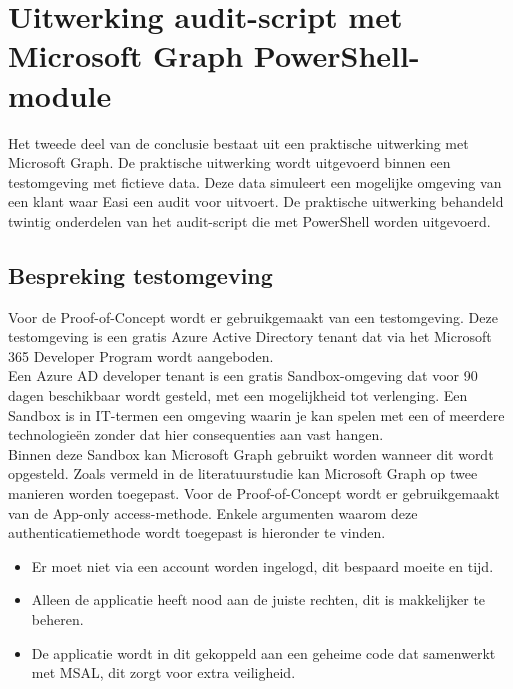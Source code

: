 
\chapter{Uitwerking audit-script met Microsoft Graph PowerShell-module}%
\label{ch:poc}


Het tweede deel van de conclusie bestaat uit een praktische uitwerking met Microsoft Graph. De praktische uitwerking wordt uitgevoerd binnen een testomgeving met fictieve data. Deze data simuleert een mogelijke omgeving van een klant waar Easi een audit voor uitvoert. De praktische uitwerking behandeld twintig onderdelen van het audit-script die met PowerShell worden uitgevoerd. %

\section{Bespreking testomgeving}

Voor de Proof-of-Concept wordt er gebruikgemaakt van een testomgeving. Deze testomgeving is een gratis Azure Active Directory tenant dat via het Microsoft 365 Developer Program wordt aangeboden. \\

Een Azure \ac{AD} developer tenant is een gratis Sandbox-omgeving dat voor 90 dagen beschikbaar wordt gesteld, met een mogelijkheid tot verlenging. Een Sandbox is in \ac{IT}-termen een omgeving waarin je kan spelen met een of meerdere technologieën zonder dat hier consequenties aan vast hangen. \\

Binnen deze Sandbox kan Microsoft Graph gebruikt worden wanneer dit wordt opgesteld. Zoals vermeld in de literatuurstudie kan Microsoft Graph op twee manieren worden toegepast. Voor de Proof-of-Concept wordt er gebruikgemaakt van de App-only access-methode. Enkele argumenten waarom deze authenticatiemethode wordt toegepast is hieronder te vinden. 

\begin{itemize}
    \item Er moet niet via een account worden ingelogd, dit bespaard moeite en tijd.
    \item Alleen de applicatie heeft nood aan de juiste rechten, dit is makkelijker te beheren.
    \item De applicatie wordt in dit gekoppeld aan een geheime code dat samenwerkt met \ac{MSAL}, dit zorgt voor extra veiligheid.
\end{itemize}

